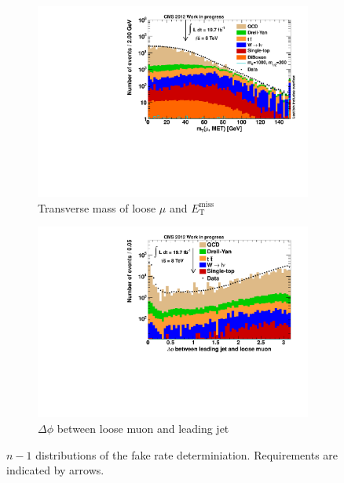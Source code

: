 \begin{figure}[!htb]
  \ContinuedFloat
  \centering
  \begin{subfigure}[b]{0.495\textwidth}
    \centering
    \includegraphics[width=\textwidth]{plots/nTL_mt.pdf}
    \caption{Transverse mass of loose $\mu$ and $E_{\text{T}}^{\text{miss}}$ \label{fig:ntlmt}}
  \end{subfigure}
  \begin{subfigure}[b]{0.495\textwidth}
    \centering
    \includegraphics[width=\textwidth]{plots/nTL_jetdphi.pdf}
    \caption{$\Delta \phi$ between loose muon and leading jet \label{fig:ntljetdphi}}
  \end{subfigure}

  \caption{$n - 1$ distributions of the fake rate determiniation. Requirements are indicated by arrows.}
  \label{fig:ntl}
\end{figure}

